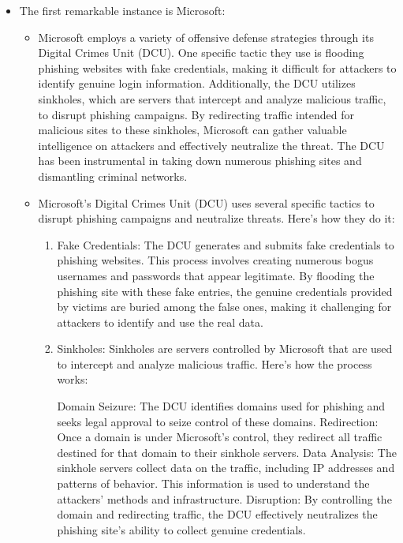 \documentclass{ijitcs}
\begin{document}
\begin{itemize}
    \item  The first remarkable instance is Microsoft:

    

\begin{itemize}



\item    Microsoft employs a variety of offensive defense strategies through its Digital Crimes Unit (DCU). One specific tactic they use is flooding phishing websites with fake credentials, making it difficult for attackers to identify genuine login information. Additionally, the DCU utilizes sinkholes, which are servers that intercept and analyze malicious traffic, to disrupt phishing campaigns. By redirecting traffic intended for malicious sites to these sinkholes, Microsoft can gather valuable intelligence on attackers and effectively neutralize the threat. The DCU has been instrumental in taking down numerous phishing sites and dismantling criminal networks.
\item    Microsoft's Digital Crimes Unit (DCU) uses several specific tactics to disrupt phishing campaigns and neutralize threats. Here's how they do it:





\begin{enumerate}
    \item   Fake Credentials:
The DCU generates and submits fake credentials to phishing websites. This process involves creating numerous bogus usernames and passwords that appear legitimate. By flooding the phishing site with these fake entries, the genuine credentials provided by victims are buried among the false ones, making it challenging for attackers to identify and use the real data.

    \item     Sinkholes:
Sinkholes are servers controlled by Microsoft that are used to intercept and analyze malicious traffic. Here's how the process works:

Domain Seizure: The DCU identifies domains used for phishing and seeks legal approval to seize control of these domains.
Redirection: Once a domain is under Microsoft's control, they redirect all traffic destined for that domain to their sinkhole servers.
Data Analysis: The sinkhole servers collect data on the traffic, including IP addresses and patterns of behavior. This information is used to understand the attackers' methods and infrastructure.
Disruption: By controlling the domain and redirecting traffic, the DCU effectively neutralizes the phishing site's ability to collect genuine credentials.




\end{enumerate}
\end{itemize}
\end{itemize}
\end{document}
